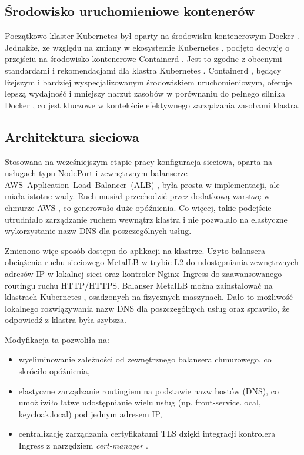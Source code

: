 \subsection{Środowisko uruchomieniowe kontenerów}

Początkowo klaster Kubernetes \cite{kubernetes} był oparty na środowisku kontenerowym Docker \cite{docker_docs}. Jednakże, ze względu na zmiany w ekosystemie Kubernetes \cite{kubernetes}, podjęto decyzję o przejściu na środowisko kontenerowe Containerd \cite{containerd_docs}. Jest to zgodne z obecnymi standardami i rekomendacjami dla klastra Kubernetes \cite{kubernetes}. Containerd \cite{containerd_docs}, będący lżejszym i bardziej wyspecjalizowanym środowiskiem uruchomieniowym, oferuje lepszą wydajność i mniejszy narzut zasobów w porównaniu do pełnego silnika Docker \cite{docker_docs}, co jest kluczowe w kontekście efektywnego zarządzania zasobami klastra.

\subsection{Architektura sieciowa}

Stosowana na wcześniejszym etapie pracy konfiguracja sieciowa, oparta na usługach typu NodePort \cite{nodeport_docs} i zewnętrznym balanserze \mbox{AWS Application Load Balancer (ALB)} \cite{alb_docs}, była prosta w implementacji, ale miała istotne wady. Ruch musiał przechodzić przez dodatkową warstwę w chmurze AWS \cite{aws_docs}, co generowało duże opóźnienia. Co więcej, takie podejście utrudniało zarządzanie ruchem wewnątrz klastra i nie pozwalało na elastyczne wykorzystanie nazw DNS dla poszczególnych usług.

Zmienono więc sposób dostępu do aplikacji na klastrze. Użyto balansera obciążenia ruchu sieciowego \mbox{MetalLB} \cite{metallb_docs} w trybie L2 do udostępniania zewnętrznych adresów IP w lokalnej sieci oraz kontroler \mbox{Nginx Ingress} \cite{nginx_ingress_docs} do zaawansowanego routingu ruchu \mbox{HTTP/HTTPS}. Balanser \mbox{MetalLB} \cite{metallb_docs} można zainstalować na klastrach Kubernetes \cite{kubernetes}, osadzonych na fizycznych maszynach. Dało to możliwość lokalnego rozwiązywania nazw DNS dla poszczególnych usług oraz sprawiło, że odpowiedź z klastra była szybsza.

\newpage

Modyfikacja ta pozwoliła na:

\vspace{0.3em}

\begin{itemize}
    \item wyeliminowanie zależności od zewnętrznego balansera chmurowego, co skróciło opóźnienia,
    \item elastyczne zarządzanie routingiem na podstawie nazw hostów (DNS), co umożliwiło łatwe udostępnianie wielu usług (np. front-service.local, keycloak.local) pod jednym adresem IP,
    \item centralizację zarządzania certyfikatami TLS dzięki integracji kontrolera Ingress z narzędziem \textit{cert-manager} \cite{cert_manager_docs}.
\end{itemize}

